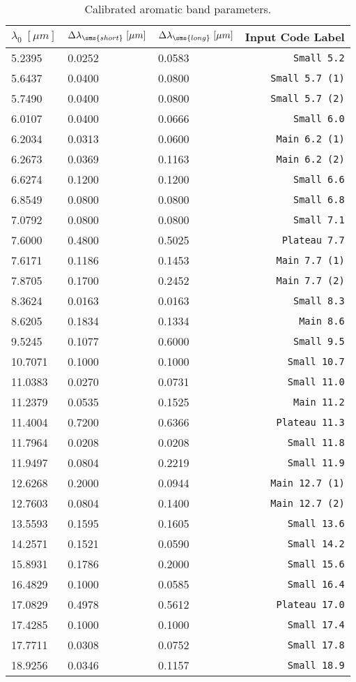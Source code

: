 \begin{table}[htbp]
\centering
\begin{tabular}{lllr}
\hline\hline
$\lambda_0\;[\mu m]$ & $\Delta\lambda_\sms{short}\;[\mu m]$ & $\Delta\lambda_\sms{long}\;[\mu m]$ & Input Code Label \\
\hline
5.2395 & 0.0252 & 0.0583 & {\tt Small 5.2} \\
5.6437 & 0.0400 & 0.0800 & {\tt Small 5.7 (1)} \\
5.7490 & 0.0400 & 0.0800 & {\tt Small 5.7 (2)} \\
6.0107 & 0.0400 & 0.0666 & {\tt Small 6.0} \\
6.2034 & 0.0313 & 0.0600 & {\tt Main 6.2 (1)} \\
6.2673 & 0.0369 & 0.1163 & {\tt Main 6.2 (2)} \\
6.6274 & 0.1200 & 0.1200 & {\tt Small 6.6} \\
6.8549 & 0.0800 & 0.0800 & {\tt Small 6.8} \\
7.0792 & 0.0800 & 0.0800 & {\tt Small 7.1} \\
7.6000 & 0.4800 & 0.5025 & {\tt Plateau 7.7} \\
7.6171 & 0.1186 & 0.1453 & {\tt Main 7.7 (1)} \\
7.8705 & 0.1700 & 0.2452 & {\tt Main 7.7 (2)} \\
8.3624 & 0.0163 & 0.0163 & {\tt Small 8.3} \\
8.6205 & 0.1834 & 0.1334 & {\tt Main 8.6} \\
9.5245 & 0.1077 & 0.6000 & {\tt Small 9.5} \\
10.7071 & 0.1000 & 0.1000 & {\tt Small 10.7} \\
11.0383 & 0.0270 & 0.0731 & {\tt Small 11.0} \\
11.2379 & 0.0535 & 0.1525 & {\tt Main 11.2} \\
11.4004 & 0.7200 & 0.6366 & {\tt Plateau 11.3} \\
11.7964 & 0.0208 & 0.0208 & {\tt Small 11.8} \\
11.9497 & 0.0804 & 0.2219 & {\tt Small 11.9} \\
12.6268 & 0.2000 & 0.0944 & {\tt Main 12.7 (1)} \\
12.7603 & 0.0804 & 0.1400 & {\tt Main 12.7 (2)} \\
13.5593 & 0.1595 & 0.1605 & {\tt Small 13.6} \\
14.2571 & 0.1521 & 0.0590 & {\tt Small 14.2} \\
15.8931 & 0.1786 & 0.2000 & {\tt Small 15.6} \\
16.4829 & 0.1000 & 0.0585 & {\tt Small 16.4} \\
17.0829 & 0.4978 & 0.5612 & {\tt Plateau 17.0} \\
17.4285 & 0.1000 & 0.1000 & {\tt Small 17.4} \\
17.7711 & 0.0308 & 0.0752 & {\tt Small 17.8} \\
18.9256 & 0.0346 & 0.1157 & {\tt Small 18.9} \\
\hline
\end{tabular}
\caption{Calibrated aromatic band parameters.}
\label{tab:bands}
\end{table}
